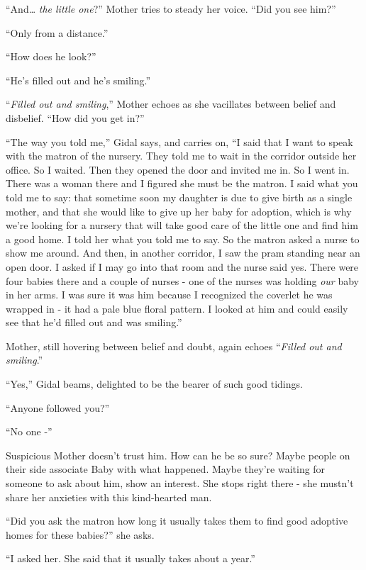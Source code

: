 \documentclass[twoside,11pt]{book}
\begin{document}
``And{\dots} \textit{the little one}?'' Mother tries to steady her voice. ``Did
you see him?''

``Only from a distance.''

``How does he look?''

``He's filled out and he's smiling.''

``\textit{Filled out and smiling},'' Mother echoes as she vacillates between belief and
disbelief. ``How did you get in?''

``The way you told me,'' Gidal says, and carries on, ``I said that I want to
speak with the matron of the nursery. They told me to wait in the corridor outside her office. So I waited. Then they
opened the door and invited me in. So I went in. There was a woman there and I figured she must be the matron. I said
what you told me to say: that sometime soon my daughter is due to give birth as a single mother, and that she would
like to give up her baby for adoption, which is why we're looking for a nursery that will take good care of the little
one and find him a good home. I told her what you told me to say. So the matron asked a nurse to show me around.  And
then, in another corridor, I saw the pram standing near an open door. I asked if I may go into that room and the nurse
said yes. There were four babies there and a couple of nurses - one of the nurses was holding \textit{our} baby in her
arms. I was sure it was him because I recognized the coverlet he was wrapped in - it had a pale blue floral pattern. I
looked at him and could easily see that he'd filled out and was smiling.''

Mother, still hovering between belief and doubt, again{ }echoes ``\textit{Filled
out and smiling}.''

``Yes,'' Gidal beams, delighted to be the bearer of such good tidings.

``Anyone followed you?''

``No one -''

Suspicious{ }Mother doesn't trust him. How can he be so sure? Maybe people on
their side associate Baby with what happened. Maybe they're waiting for someone to ask about him, show an interest. She
stops right there {}- she mustn't share her anxieties with this kind-hearted man.

``Did you ask the matron how long it usually takes them to find good adoptive homes for these
babies?'' she asks.

``I asked her. She said that it usually takes about a year.''
\end{document}
